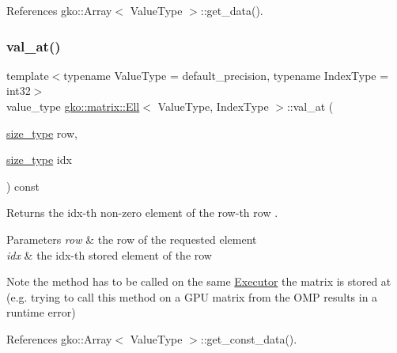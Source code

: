 References gko\+::\+Array$<$ Value\+Type $>$\+::get\+\_\+data().

\mbox{\label{classgko_1_1matrix_1_1Ell_a3591fa0ab2ec09b43a15b0f0649d8ea3}} 
\subsubsection{\texorpdfstring{val\+\_\+at()}{val\_at()}\hspace{0.1cm}{\footnotesize\ttfamily [2/2]}}
{\footnotesize\ttfamily template$<$typename Value\+Type = default\+\_\+precision, typename Index\+Type = int32$>$ \\
value\+\_\+type \hyperlink{classgko_1_1matrix_1_1Ell}{gko\+::matrix\+::\+Ell}$<$ Value\+Type, Index\+Type $>$\+::val\+\_\+at (\begin{DoxyParamCaption}\item[{\hyperlink{namespacegko_a6e5c95df0ae4e47aab2f604a22d98ee7}{size\+\_\+type}}]{row,  }\item[{\hyperlink{namespacegko_a6e5c95df0ae4e47aab2f604a22d98ee7}{size\+\_\+type}}]{idx }\end{DoxyParamCaption}) const\hspace{0.3cm}{\ttfamily [noexcept]}}



Returns the {\ttfamily idx}-\/th non-\/zero element of the {\ttfamily row}-\/th row . 


\begin{DoxyParams}{Parameters}
{\em row} & the row of the requested element \\
\hline
{\em idx} & the idx-\/th stored element of the row\\
\hline
\end{DoxyParams}
\begin{DoxyNote}{Note}
the method has to be called on the same \hyperlink{classgko_1_1Executor}{Executor} the matrix is stored at (e.\+g. trying to call this method on a G\+PU matrix from the O\+MP results in a runtime error) 
\end{DoxyNote}


References gko\+::\+Array$<$ Value\+Type $>$\+::get\+\_\+const\+\_\+data().

\mbox{\label{classgko_1_1matrix_1_1Ell_afa9148a16a9255003055d8e9156ee941}} 
